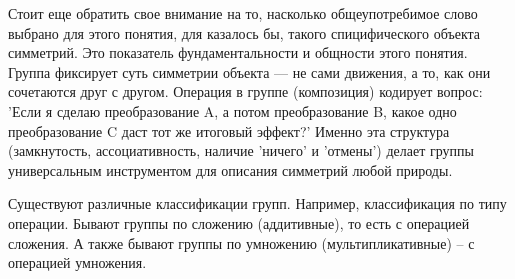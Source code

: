 Стоит еще обратить свое внимание на то, насколько общеупотребимое слово выбрано для этого понятия, для казалось бы, такого спицифического объекта симметрий. Это показатель фундаментальности и общности этого понятия.
Группа фиксирует суть симметрии объекта --- не сами движения, а то, как они сочетаются друг с другом. Операция в группе (композиция) кодирует вопрос: 'Если я сделаю преобразование A, а потом преобразование B, какое одно преобразование C даст тот же итоговый эффект?' Именно эта структура (замкнутость, ассоциативность, наличие 'ничего' и 'отмены') делает группы универсальным инструментом для описания симметрий любой природы.

Существуют различные классификации групп. Например, классификация по типу операции. 
Бывают группы по сложению (аддитивные), то есть с операцией сложения. 
А также бывают группы по умножению (мультипликативные) -- с операцией умножения.


